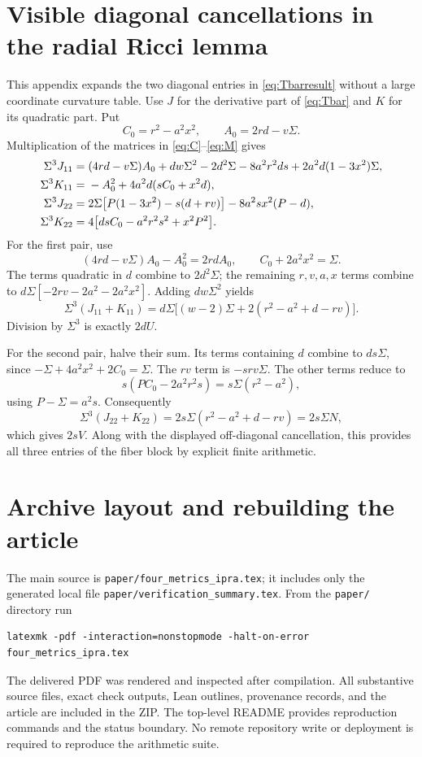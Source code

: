 \documentclass[11pt,a4paper]{article}
\numberwithin{equation}{section}
\theoremstyle{definition}\newtheorem{definition}[theorem]{Definition}
\theoremstyle{remark}\newtheorem{remark}[theorem]{Remark}
\newcommand{\file}[1]{\nolinkurl{#1}}
\begin{document}
\appendix
\section{Visible diagonal cancellations in the radial Ricci lemma}\label{app:diagonal}
This appendix expands the two diagonal entries in \eqref{eq:Tbarresult} without a large coordinate curvature table. Use $J$ for the derivative part of \eqref{eq:Tbar} and $K$ for its quadratic part. Put
\[
 C_0=r^2-a^2x^2,\qquad A_0=2rd-v\Sigma.
\]
Multiplication of the matrices in \eqref{eq:C}--\eqref{eq:M} gives
\begin{align}
 \Sigma^3J_{11}={}&(4rd-v\Sigma)A_0+dw\Sigma^2-2d^2\Sigma
                -8a^2r^2ds+2a^2d(1-3x^2)\Sigma,\notag\\
 \Sigma^3K_{11}={}&-A_0^2+4a^2d(sC_0+x^2d),\label{eq:diag11}\\
 \Sigma^3J_{22}={}&2\Sigma\bigl[P(1-3x^2)-s(d+rv)\bigr]
                        -8a^2sx^2(P-d),\notag\\
 \Sigma^3K_{22}={}&4\bigl[dsC_0-a^2r^2s^2+x^2P^2\bigr].\label{eq:diag22}
\end{align}
For the first pair, use
\[
 (4rd-v\Sigma)A_0-A_0^2=2rdA_0,
 \qquad C_0+2a^2x^2=\Sigma.
\]
The terms quadratic in $d$ combine to $2d^2\Sigma$; the remaining $r,v,a,x$ terms combine to $d\Sigma[-2rv-2a^2-2a^2x^2]$. Adding $dw\Sigma^2$ yields
\[
 \Sigma^3(J_{11}+K_{11})
 =d\Sigma\bigl[(w-2)\Sigma+2(r^2-a^2+d-rv)\bigr].
\]
Division by $\Sigma^3$ is exactly $2dU$.

For the second pair, halve their sum. Its terms containing $d$ combine to $ds\Sigma$, since $-\Sigma+4a^2x^2+2C_0=\Sigma$. The $rv$ term is $-srv\Sigma$. The other terms reduce to
\[
 s(PC_0-2a^2r^2s)=s\Sigma(r^2-a^2),
\]
using $P-\Sigma=a^2s$. Consequently
\[
 \Sigma^3(J_{22}+K_{22})=2s\Sigma(r^2-a^2+d-rv)=2s\Sigma N,
\]
which gives $2sV$. Along with the displayed off-diagonal cancellation, this provides all three entries of the fiber block by explicit finite arithmetic.

\section{Archive layout and rebuilding the article}
The main source is \file{paper/four_metrics_ipra.tex}; it includes only the generated local file \file{paper/verification_summary.tex}. From the \file{paper/} directory run
\begin{lstlisting}
latexmk -pdf -interaction=nonstopmode -halt-on-error four_metrics_ipra.tex
\end{lstlisting}
The delivered PDF was rendered and inspected after compilation. All substantive source files, exact check outputs, Lean outlines, provenance records, and the article are included in the ZIP. The top-level README provides reproduction commands and the status boundary. No remote repository write or deployment is required to reproduce the arithmetic suite.
\end{document}
